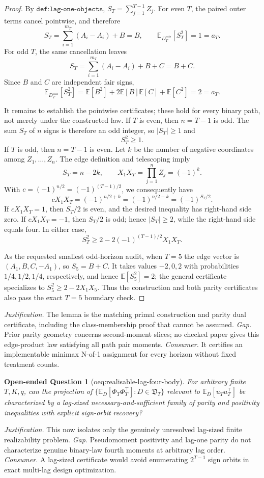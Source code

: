 \documentclass{article}
\newtheorem{openendedquestion}{Open-ended Question}
\begin{document}
\begin{proof}
By \(\texttt{def:lag-one-objects}\), \(S_T=\sum_{j=1}^{T-1}Z_j\).  For even \(T\), the paired outer terms cancel pointwise, and therefore
\[
 S_T=\sum_{i=1}^{m_T}(A_i-A_i)+B=B,
 \qquad
 \mathbb E_{D_T^{\mathrm{mir}}}[S_T^2]=1=a_T.
\]
For odd \(T\), the same cancellation leaves
\[
 S_T=\sum_{i=1}^{m_T}(A_i-A_i)+B+C=B+C.
\]
Since \(B\) and \(C\) are independent fair signs,
\[
 \mathbb E_{D_T^{\mathrm{mir}}}[S_T^2]
 =\mathbb E[B^2]+2\mathbb E[B]\mathbb E[C]+\mathbb E[C^2]
 =2=a_T.
\]

It remains to establish the pointwise certificates; these hold for every binary path, not merely under the constructed law.  If \(T\) is even, then \(n=T-1\) is odd.  The sum \(S_T\) of \(n\) signs is therefore an odd integer, so \(|S_T|\ge1\) and
\[
 S_T^2\ge1.
\]
If \(T\) is odd, then \(n=T-1\) is even.  Let \(k\) be the number of negative coordinates among \(Z_1,\ldots,Z_n\).  The edge definition and telescoping imply
\[
 S_T=n-2k,
 \qquad
 X_1X_T=\prod_{j=1}^{n}Z_j=(-1)^k.
\]
With \(c=(-1)^{n/2}=(-1)^{(T-1)/2}\), we consequently have
\[
 cX_1X_T=(-1)^{n/2+k}=(-1)^{n/2-k}=(-1)^{S_T/2}.
\]
If \(cX_1X_T=1\), then \(S_T/2\) is even, and the desired inequality has right-hand side zero.  If \(cX_1X_T=-1\), then \(S_T/2\) is odd; hence \(|S_T|\ge2\), while the right-hand side equals four.  In either case,
\[
 S_T^2\ge 2-2(-1)^{(T-1)/2}X_1X_T.
\]

As the requested smallest odd-horizon audit, when \(T=5\) the edge vector is \((A_1,B,C,-A_1)\), so \(S_5=B+C\).  It takes values \(-2,0,2\) with probabilities \(1/4,1/2,1/4\), respectively, and hence \(\mathbb E[S_5^2]=2\); the general certificate specializes to \(S_5^2\ge2-2X_1X_5\).  Thus the construction and both parity certificates also pass the exact \(T=5\) boundary check.
\end{proof}
\par\smallskip\noindent \textit{Justification.} The lemma is the matching primal construction and parity dual certificate, including the class-membership proof that cannot be assumed. \textit{Gap.} Prior parity geometry concerns second-moment slices; no checked paper gives this edge-product law satisfying all path pair moments. \textit{Consumer.} It certifies an implementable minimax N-of-1 assignment for every horizon without fixed treatment counts.

\begin{openendedquestion}[oeq:realisable-lag-four-body]\label{oeq:realisable-lag-four-body}
For arbitrary finite \(T,K,q\), can the projection of \(\{\mathbb E_D[\Phi_T\Phi_T^{\top}]:D\in\mathfrak D_T\}\) relevant to \(\mathbb E_D[u_Tu_T^{\top}]\) be characterized by a lag-sized necessary-and-sufficient family of parity and positivity inequalities with explicit sign-orbit recovery?
\end{openendedquestion}
\par\smallskip\noindent \textit{Justification.} This now isolates only the genuinely unresolved lag-sized finite realizability problem. \textit{Gap.} Pseudomoment positivity and lag-one parity do not characterize genuine binary-law fourth moments at arbitrary lag order. \textit{Consumer.} A lag-sized certificate would avoid enumerating \(2^{T-1}\) sign orbits in exact multi-lag design optimization.
\end{document}
